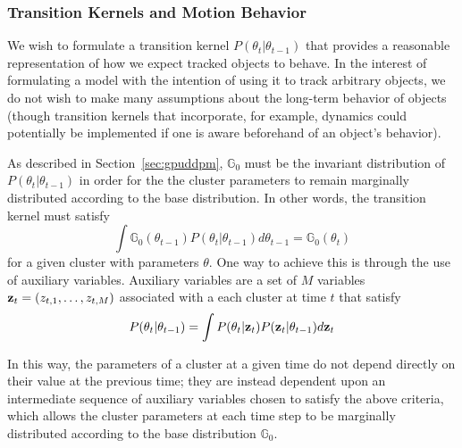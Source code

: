 \documentclass[smallcondensed, final]{svjour3}
\begin{document}

\subsubsection{Transition Kernels and Motion Behavior}

We wish to formulate a transition kernel $P(\theta_{t} | \theta_{t-1})$ that provides a reasonable representation of how we expect tracked objects to behave. In the interest of formulating a model with the intention of using it to track arbitrary objects, we do not wish to make many assumptions about the long-term behavior of objects (though transition kernels that incorporate, for example, dynamics could potentially be implemented if one is aware beforehand of an object's behavior).

As described in Section~\ref{sec:gpuddpm}, $\mathbb{G}_{0}$ must be the invariant distribution of $P(\theta_{t} | \theta_{t-1})$ in order for the the cluster parameters to remain marginally distributed according to the base distribution. In other words, the transition kernel must satisfy
\begin{equation}
\int \mathbb{G}_{0}(\theta_{t-1})P(\theta_{t} | \theta_{t-1}) d\theta_{t-1} = \mathbb{G}_{0}(\theta_{t})
\end{equation}
for a given cluster with parameters $\theta$. One way to achieve this is through the use of auxiliary variables. Auxiliary variables are a set of $M$ variables $\bold{z}_{t} = (z_{t,1}, \ldots, z_{t,M})$ associated with a each cluster at time $t$ that satisfy
\begin{eqnarray}
P(\theta_{t} | \theta_{t-1}) = \int P(\theta_{t} | \bold{z}_{t}) P(\bold{z}_{t} | \theta_{t-1}) d \bold{z}_{t}  %
\end{eqnarray}

In this way, the parameters of a cluster at a given time do not depend directly on their value at the previous time; they are instead dependent upon an intermediate sequence of auxiliary variables chosen to satisfy the above criteria, which allows the cluster parameters at each time step to be marginally distributed according to the base distribution $\mathbb{G}_{0}$.
\end{document}
